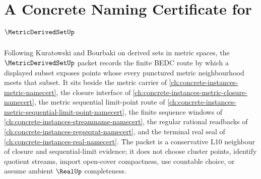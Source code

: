 \chapter{A Concrete Naming Certificate for $\MetricDerivedSetUp$}
\label{ch:concrete-instances-metric-derived-set-namecert}

Following Kuratowski and Bourbaki on derived sets in metric spaces, the $\MetricDerivedSetUp$ packet records the finite BEDC route by which a displayed subset exposes points whose every punctured metric neighbourhood meets that subset. It sits beside the metric carrier of \autoref{ch:concrete-instances-metric-namecert}, the closure interface of \autoref{ch:concrete-instances-metric-closure-namecert}, the metric sequential limit-point route of \autoref{ch:concrete-instances-metric-sequential-limit-point-namecert}, the finite sequence windows of \autoref{ch:concrete-instances-streamname-namecert}, the regular rational readbacks of \autoref{ch:concrete-instances-regseqrat-namecert}, and the terminal real seal of \autoref{ch:concrete-instances-real-namecert}. The packet is a conservative L10 neighbour of closure and sequential-limit evidence; it does not choose cluster points, identify quotient streams, import open-cover compactness, use countable choice, or assume ambient $\RealUp$ completeness.

